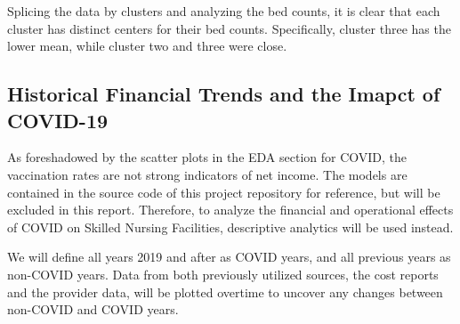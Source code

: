 \documentclass{article}
\theoremstyle{mytheoremstyle}
\theoremstyle{mytheoremstyle}
\theoremstyle{myproblemstyle}
\begin{document}
\noindent Splicing the data by clusters and analyzing the bed counts, it is clear that each cluster has distinct centers for their bed counts. Specifically, cluster three has the lower mean, while cluster two and three were close. 


\pagebreak

\subsection{Historical Financial Trends and the Imapct of COVID-19}
As foreshadowed by the scatter plots in the EDA section for COVID, the vaccination rates are not strong indicators of net income. The models are contained in the source code of  this project repository for reference, but will be excluded in this report. Therefore, to analyze the financial and operational effects of COVID on Skilled Nursing Facilities, descriptive analytics will be used instead.

We will define all years 2019 and after as COVID years, and all previous years as non-COVID years. Data from both previously utilized sources, the cost reports and the provider data, will be plotted overtime to uncover any changes between non-COVID and COVID years.
\end{document}

